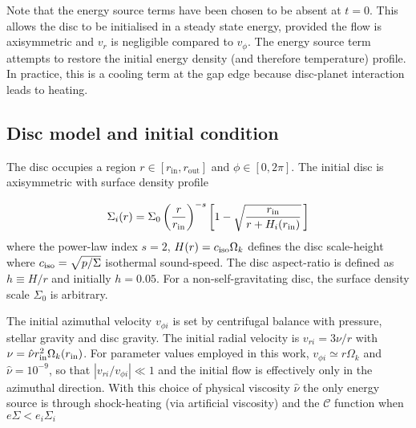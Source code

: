 Note that the energy source terms have been chosen to be absent 
at $t=0$. This allows the disc to be initialised in a steady state
energy, provided the flow is axisymmetric and $v_r$ is negligible compared to $v_\phi$.  
The energy source term attempts to restore the initial energy density (and
therefore temperature) profile. In practice, this is a cooling term at
the gap edge because disc-planet interaction leads to heating.  


\subsection{Disc model and initial condition}
The disc occupies a region $r\in[r_\mathrm{in}, r_\mathrm{out}]$ and $\phi\in[0,2\pi]$. The initial disc is axisymmetric with
surface density profile  
 
\begin{align}\label{initial_density}
   \Sigma_i(r) = \Sigma_0\left(\frac{r}{r_\mathrm{in}}\right)^{-s}
    \left[1 - \sqrt{\frac{r_\mathrm{in}}{r + H_i(r_\mathrm{in})}}\,\right] 
\end{align}
where the power-law index $s=2$, $H(r) = c_\mathrm{iso}\Omega_k $ defines the disc scale-height 
where $c_\mathrm{iso}=\sqrt{p/\Sigma}$ isothermal sound-speed. The disc aspect-ratio is defined as $h\equiv H/r$ and initially
$h=0.05$. For a non-self-gravitating disc, the surface density scale
$\Sigma_0$ is arbitrary. 


The initial azimuthal velocity $v_{\phi i}$ is set by centrifugal balance with
pressure, stellar gravity and disc gravity. The initial radial velocity is $v_{r i}=3\nu/r$ 
with $\nu = \hat{\nu}r_\mathrm{in}^2\Omega_k(r_\mathrm{in})$. For parameter values employed in this work, $v_{\phi i}\simeq r\Omega_k$ 
and $\hat{\nu}= 10^{-9}$, so that $|v_{r i}/v_{\phi i}|\ll1$ and the initial 
flow is effectively only in the azimuthal direction.  With this choice of physical viscosity $\hat{\nu}$ the only energy source is through shock-heating (via artificial viscosity) and the $\mathcal{C}$ function when $e\Sigma<e_i\Sigma_i$


